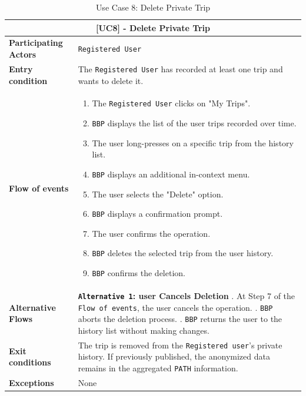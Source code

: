 \begin{table}[H]
\centering
\begin{tabularx}{\textwidth}{|l|X|}
\hline
\multicolumn{2}{|c|}{\textbf{[UC8] - Delete Private Trip}} \\ \hline
\textbf{Participating Actors} & \texttt{Registered User} \\ \hline
\textbf{Entry condition}      & The \texttt{Registered User} has recorded at least one trip and wants to delete it. \\ \hline
\textbf{Flow of events}       & 
\begin{enumerate}
    \item The \texttt{Registered User} clicks on "My Trips".
    \item \texttt{BBP} displays the list of the user trips recorded over time.
    \item The user long-presses on a specific trip from the history list.
    \item \texttt{BBP} displays an additional in-context menu.
    \item The user selects the "Delete" option.
    \item \texttt{BBP} displays a confirmation prompt.
    \item The user confirms the operation.
    \item \texttt{BBP} deletes the selected trip from the user history.
    \item \texttt{BBP} confirms the deletion.
\end{enumerate} \\ \hline
\textbf{Alternative Flows}    & 
\textbf{\texttt{Alternative 1}: user Cancels Deletion} \newline
1. At Step 7 of the \texttt{Flow of events}, the user cancels the operation. \newline
2. \texttt{BBP} aborts the deletion process. \newline
3. \texttt{BBP} returns the user to the history list without making changes. \\ \hline
\textbf{Exit conditions}      & The trip is removed from the \texttt{Registered user}'s private history. If previously published, the anonymized data remains in the aggregated \texttt{PATH} information. \\ \hline
\textbf{Exceptions} & None \\ \hline
\end{tabularx}
\caption{Use Case 8: Delete Private Trip}
\label{tab:uc8}
\end{table}

